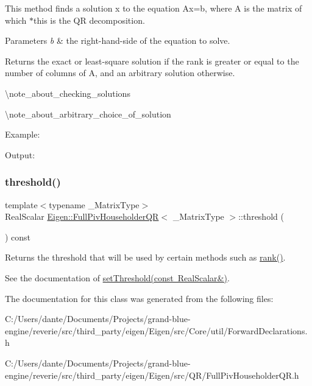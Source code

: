 This method finds a solution x to the equation Ax=b, where A is the matrix of which {\ttfamily $\ast$this} is the QR decomposition.


\begin{DoxyParams}{Parameters}
{\em b} & the right-\/hand-\/side of the equation to solve.\\
\hline
\end{DoxyParams}
\begin{DoxyReturn}{Returns}
the exact or least-\/square solution if the rank is greater or equal to the number of columns of A, and an arbitrary solution otherwise.
\end{DoxyReturn}
\textbackslash{}note\+\_\+about\+\_\+checking\+\_\+solutions

\textbackslash{}note\+\_\+about\+\_\+arbitrary\+\_\+choice\+\_\+of\+\_\+solution

Example\+: 
\begin{DoxyCodeInclude}{0}
\end{DoxyCodeInclude}
 Output\+: 
\begin{DoxyVerbInclude}
\end{DoxyVerbInclude}
 \mbox{\label{class_eigen_1_1_full_piv_householder_q_r_af7f6ac15ca19c2b9e45dc3eaae58c201}} 
\subsubsection{\texorpdfstring{threshold()}{threshold()}}
{\footnotesize\ttfamily template$<$typename \+\_\+\+Matrix\+Type$>$ \\
Real\+Scalar \mbox{\hyperlink{class_eigen_1_1_full_piv_householder_q_r}{Eigen\+::\+Full\+Piv\+Householder\+QR}}$<$ \+\_\+\+Matrix\+Type $>$\+::threshold (\begin{DoxyParamCaption}{ }\end{DoxyParamCaption}) const\hspace{0.3cm}{\ttfamily [inline]}}

Returns the threshold that will be used by certain methods such as \mbox{\hyperlink{class_eigen_1_1_full_piv_householder_q_r_aeae555220f46477818ccc94aca2de770}{rank()}}.

See the documentation of \mbox{\hyperlink{class_eigen_1_1_full_piv_householder_q_r_a92277e572bf98245891015d12dd2b602}{set\+Threshold(const Real\+Scalar\&)}}. 

The documentation for this class was generated from the following files\+:\begin{DoxyCompactItemize}
\item 
C\+:/\+Users/dante/\+Documents/\+Projects/grand-\/blue-\/engine/reverie/src/third\+\_\+party/eigen/\+Eigen/src/\+Core/util/Forward\+Declarations.\+h\item 
C\+:/\+Users/dante/\+Documents/\+Projects/grand-\/blue-\/engine/reverie/src/third\+\_\+party/eigen/\+Eigen/src/\+Q\+R/Full\+Piv\+Householder\+Q\+R.\+h\end{DoxyCompactItemize}
